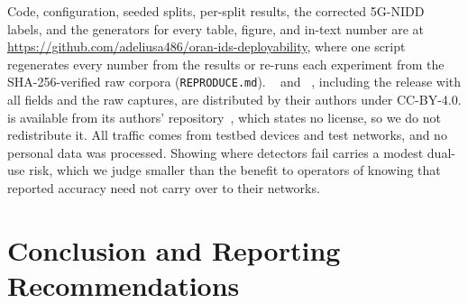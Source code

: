 Code, configuration, seeded splits, per-split results, the corrected 5G-NIDD labels, and the generators for every table, figure, and in-text number are at \textcolor{blue}{\url{https://github.com/adeliusa486/oran-ids-deployability}}, where one script regenerates every number from the results or re-runs each experiment from the SHA-256-verified raw corpora (\texttt{REPRODUCE.md}). \DA{}~\cite{abedzadeh2025netslab} and \DB{}~\cite{samarakoon2022nidd}, including the release with all fields and the raw captures, are distributed by their authors under CC-BY-4.0. \DC{} is available from its authors' repository~\cite{nugraha2025fivegdatasets}, which states no license, so we do not redistribute it. All traffic comes from testbed devices and test networks, and no personal data was processed. Showing where detectors fail carries a modest dual-use risk, which we judge smaller than the benefit to operators of knowing that reported accuracy need not carry over to their networks.

\section{Conclusion and Reporting Recommendations}
\label{sec:conclusion}


